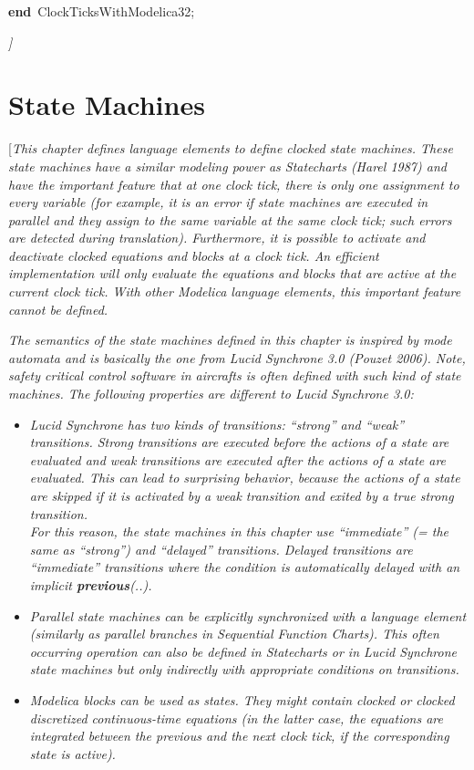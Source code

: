 \documentclass[10pt,a4paper]{report}
\def\doublelabel#1{\label{#1}\hypertarget{#1}{}}
\begin{document}
\textbf{end}~ClockTicksWithModelica32;

\emph{{]}}

\chapter{State Machines}\doublelabel{state-machines}

{[}\emph{This chapter defines language elements to define clocked state
machines. These state machines have a similar modeling power as
Statecharts (Harel 1987) and have the important feature that at one
clock tick, there is only one assignment to every variable (for example,
it is an error if state machines are executed in parallel and they
assign to the same variable at the same clock tick; such errors are
detected during translation). Furthermore, it is possible to activate
and deactivate clocked equations and blocks at a clock tick. An
efficient implementation will only evaluate the equations and blocks
that are active at the current clock tick. With other Modelica language
elements, this important feature cannot be defined.}

\emph{The semantics of the state machines defined in this chapter is
inspired by mode automata and is basically the one from Lucid Synchrone
3.0 (Pouzet 2006). Note, safety critical control software in aircrafts
is often defined with such kind of state machines. The following
properties are different to Lucid Synchrone 3.0:}

\begin{itemize}
\item
  \emph{Lucid Synchrone has two kinds of transitions: ``strong'' and
  ``weak'' transitions. Strong transitions are executed before the
  actions of a state are evaluated and weak transitions are executed
  after the actions of a state are evaluated. This can lead to
  surprising behavior, because the actions of a state are skipped if it
  is activated by a weak transition and exited by a true strong
  transition.\\
  For this reason, the state machines in this chapter use ``immediate''
  (= the same as ``strong'') and ``delayed'' transitions. Delayed
  transitions are ``immediate'' transitions where the condition is
  automatically delayed with an implicit \textbf{previous}(..). }
\item
  \emph{Parallel state machines can be explicitly synchronized with a
  language element (similarly as parallel branches in Sequential
  Function Charts). This often occurring operation can also be defined
  in Statecharts or in Lucid Synchrone state machines but only
  indirectly with appropriate conditions on transitions.}
\item
  \emph{Modelica blocks can be used as states. They might contain
  clocked or clocked discretized continuous-time equations (in the
  latter case, the equations are integrated between the previous and the
  next clock tick, if the corresponding state is active).}
\end{itemize}
\end{document}
